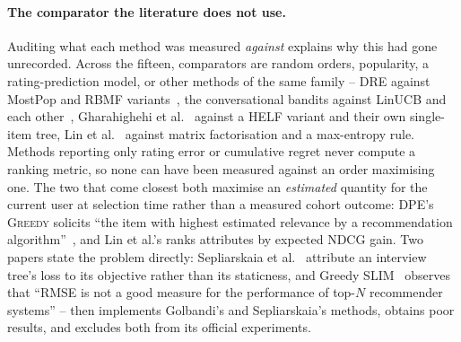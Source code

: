 \documentclass[runningheads]{llncs}
\begin{document}
\paragraph{The comparator the literature does not use.}
Auditing what each method was measured \emph{against} explains why this had gone unrecorded. Across
the fifteen, comparators are random orders, popularity, a
rating-prediction model, or other methods of the same family -- DRE against MostPop and RBMF
variants~\cite{kweon2020deep}, the conversational bandits against LinUCB and each
other~\cite{zhang2020conucb,wang2023conlinucb,liu2025clisk}, Gharahighehi et
al.~\cite{gharahighehi2025pairwise} against a HELF variant and their own single-item tree, Lin et
al.~\cite{lin2023upsrec} against matrix factorisation and a max-entropy rule. Methods reporting only rating error or cumulative regret never compute a ranking
metric, so none can have been measured against an order maximising one. The two that come closest
both maximise an \emph{estimated} quantity for the current user at selection time rather than a
measured cohort outcome: DPE's \textsc{Greedy} solicits ``the item with highest estimated relevance
by a recommendation algorithm''~\cite{parapar2021dpe}, and Lin et al.'s ranks attributes by expected NDCG gain. Two papers state the problem directly: Sepliarskaia et
al.~\cite{sepliarskaia2018spq} attribute an interview tree's loss to its objective rather than its
staticness, and Greedy SLIM~\cite{proissl2024greedyslim} observes
that ``RMSE is not a good measure for the performance of top-$N$ recommender systems'' -- then
implements Golbandi's and Sepliarskaia's methods, obtains poor results, and excludes both from its
official experiments.
\end{document}
